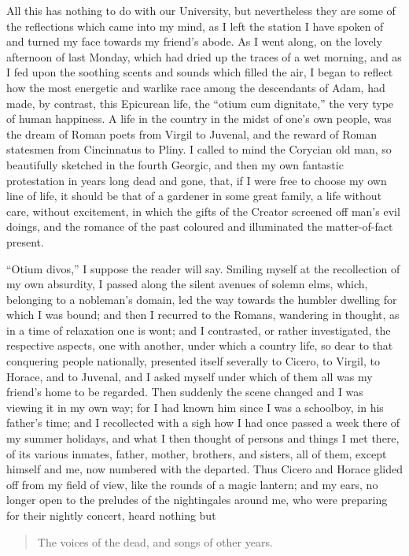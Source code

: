 All this has nothing to do with our University, but nevertheless
they are some of the reflections which came into my mind, as I left
the station I have spoken of and turned my face towards my friend's
abode. As I went along, on the lovely afternoon of last Monday, which
had dried up the traces of a wet morning, and as I fed upon the
soothing scents and sounds which filled the air, I began to reflect
how the most energetic and warlike race among the descendants of Adam,
had made, by contrast, this Epicurean life, the ``otium cum
dignitate,'' the very type of human happiness. A life in the
country in the midst of one's own people, was the dream of Roman poets
from Virgil to Juvenal, and the reward of Roman statesmen from
Cincinnatus to Pliny. I called to mind the Corycian old man, so
beautifully sketched in the fourth Georgic, and then my own fantastic
protestation in years long dead and gone, that, if I were free to
choose my own line of life, it should be that of a gardener in some
great family, a life without care, without excitement, in which the
gifts of the Creator screened off man's evil doings, and the romance
of the past coloured and illuminated the matter-of-fact present.

``Otium divos,'' I suppose the reader will say. Smiling
myself at the recollection of my own absurdity, I passed along the
silent avenues of solemn elms, which, belonging to a nobleman's
domain, led the way towards the humbler dwelling for which I was
bound; and then I recurred to the Romans, wandering in thought,
as in a time of relaxation one is wont; and I contrasted, or rather
investigated, the respective aspects, one with another, under which a
country life, so dear to that conquering people nationally, presented
itself severally to Cicero, to Virgil, to Horace, and to Juvenal, and
I asked myself under which of them all was my friend's home to be
regarded. Then suddenly the scene changed and I was viewing it in my
own way; for I had known him since I was a schoolboy, in his father's
time; and I recollected with a sigh how I had once passed a week there
of my summer holidays, and what I then thought of persons and things I
met there, of its various inmates, father, mother, brothers, and
sisters, all of them, except himself and me, now numbered with the
departed. Thus Cicero and Horace glided off from my field of view,
like the rounds of a magic lantern; and my ears, no longer open to the
preludes of the nightingales around me, who were preparing for their
nightly concert, heard nothing but

\begin{quote}

The voices of the dead, and songs of other years.

\end{quote}

